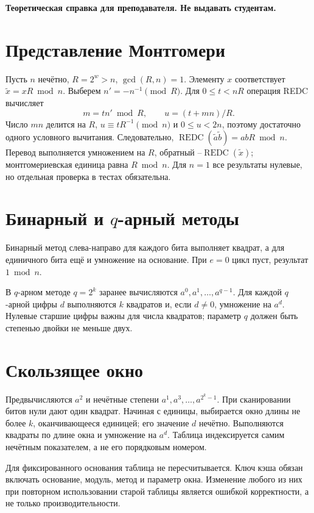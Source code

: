 \documentclass[12pt]{ca-capstone}
\begin{document}
\begin{center}\textbf{Теоретическая справка для преподавателя. Не выдавать студентам.}\end{center}

\section{Представление Монтгомери}
Пусть $n$ нечётно, $R=2^w>n$, $\gcd(R,n)=1$. Элементу $x$ соответствует $\tilde x=xR\bmod n$.
Выберем $n'=-n^{-1}\pmod R$. Для $0\le t<nR$ операция REDC вычисляет
\[
 m=t n'\bmod R,\qquad u=(t+mn)/R.
\]
Число $mn$ делится на $R$, $u\equiv tR^{-1}\pmod n$ и $0\le u<2n$, поэтому достаточно одного
условного вычитания. Следовательно,
$\operatorname{REDC}(\tilde a\tilde b)=abR\bmod n$. Перевод выполняется умножением на $R$,
обратный --$\operatorname{REDC}(\tilde x)$; монтгомериевская единица равна $R\bmod n$.
Для $n=1$ все результаты нулевые, но отдельная проверка в тестах обязательна.

\section{Бинарный и $q$-арный методы}
Бинарный метод слева-направо для каждого бита выполняет квадрат, а для единичного бита ещё и
умножение на основание. При $e=0$ цикл пуст, результат $1\bmod n$.

В $q$-арном методе $q=2^k$ заранее вычисляются $a^0,a^1,\ldots,a^{q-1}$. Для каждой $q$-арной
цифры $d$ выполняются $k$ квадратов и, если $d\ne0$, умножение на $a^d$. Нулевые старшие цифры
важны для числа квадратов; параметр $q$ должен быть степенью двойки не меньше двух.

\section{Скользящее окно}
Предвычисляются $a^2$ и нечётные степени $a^1,a^3,\ldots,a^{2^k-1}$. При сканировании битов
нули дают один квадрат. Начиная с единицы, выбирается окно длины не более $k$, оканчивающееся
единицей; его значение $d$ нечётно. Выполняются квадраты по длине окна и умножение на $a^d$.
Таблица индексируется самим нечётным показателем, а не его порядковым номером.

Для фиксированного основания таблица не пересчитывается. Ключ кэша обязан включать основание,
модуль, метод и параметр окна. Изменение любого из них при повторном использовании старой
таблицы является ошибкой корректности, а не только производительности.
\end{document}
